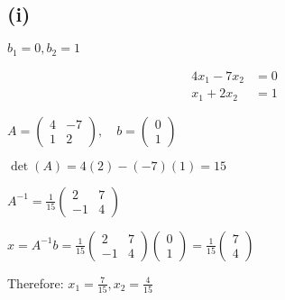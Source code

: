 \subsection*{(i)} $b_1 = 0, b_2 = 1$

\begin{align}
	4x_1 - 7x_2 & = 0 \\
	x_1 + 2x_2  & = 1
\end{align}

$A = \begin{pmatrix}
	4 & -7 \\
	1 & 2
\end{pmatrix}, \quad b = \begin{pmatrix}
	0 \\
	1
\end{pmatrix}$

$\det(A) = 4(2) - (-7)(1) = 15$

$A^{-1} = \frac{1}{15}\begin{pmatrix}
	2 & 7 \\
	-1 & 4
\end{pmatrix}$

$x = A^{-1}b = \frac{1}{15}\begin{pmatrix}
	2 & 7 \\
	-1 & 4
\end{pmatrix}\begin{pmatrix}
	0 \\
	1
\end{pmatrix} = \frac{1}{15}\begin{pmatrix}
	7 \\
	4
\end{pmatrix}$

Therefore: $x_1 = \frac{7}{15}, x_2 = \frac{4}{15}$